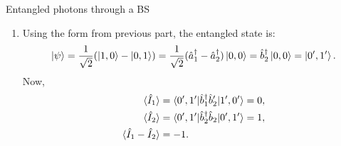 \begin{example}{Entangled photons through a BS}
\begin{enumerate}[itemsep=0pt,topsep=0pt,parsep=0pt,label=\roman*)]
{\begin{align*}
    \end{align*}}
    I should distribute and solve the 16 terms. However, I can express the input in the following way:
    \begin{align*}
      \ket{\psi}=\frac{1}{\sqrt{2}}(\ha_1^\dagger+\ha_2^\dagger)\ket{0,0}=\hb_1^\dagger\ket{0,0}=\ket{1',0'}.
    \end{align*}
    which is simpler to use, because:
    \begin{align*}
      \braket{\hI_1}=\braket{0',1'|\hb_1^\dagger\hb_1|1',0'}=\braket{0',1'|1',0'}=1.
    \end{align*}
    For the detector 2, the expected number of photon is:
    \begin{align*}
      \braket{\hI_2}=\braket{0',1'|\hb_2^\dagger\hb_2|1',0'}=0.
    \end{align*}
    Therefore,
    \begin{align*}
      \braket{\hI_1-\hI_2}=\braket{\hI_1}-\braket{\hI_2}=1.
    \end{align*}
    \item Using the form from previous part, the entangled state is:
    \begin{align*}
      \left|\psi\right\rangle=\frac{1}{\sqrt{2}}(\left|1,0\right\rangle-\left|0,1\right\rangle)=\frac{1}{\sqrt{2}}(\hat{a}_1^\dagger-\hat{a}_2^\dagger)\left|0,0\right\rangle=\hat{b}_2^\dagger\left|0,0\right\rangle=\left|0',1'\right\rangle.
    \end{align*}
    Now, 
    \begin{align*}
      \langle\hat{I}_1\rangle&=\langle0',1'|\hat{b}_1^\dagger\hat{b}_2'|1',0'\rangle=0,\\
      \langle\hat{I}_2\rangle&=\langle0',1'|\hat{b}_2^\dagger\hat{b}_2|0',1'\rangle=1,\\
      \langle\hat{I}_1-\hat{I}_2\rangle&=-1.
    \end{align*}
  \end{enumerate}
\end{example}

